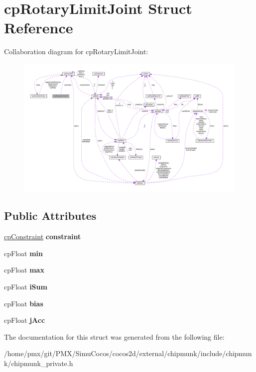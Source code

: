 \hypertarget{structcpRotaryLimitJoint}{}\section{cp\+Rotary\+Limit\+Joint Struct Reference}
\label{structcpRotaryLimitJoint}


Collaboration diagram for cp\+Rotary\+Limit\+Joint\+:
\nopagebreak
\begin{figure}[H]
\begin{center}
\leavevmode
\includegraphics[width=350pt]{structcpRotaryLimitJoint__coll__graph}
\end{center}
\end{figure}
\subsection*{Public Attributes}
\begin{DoxyCompactItemize}
\item 
\mbox{\label{structcpRotaryLimitJoint_a447ab04f7ecace3c2cb7a9ad19e974ff}} 
\hyperlink{structcpConstraint}{cp\+Constraint} {\bfseries constraint}
\item 
\mbox{\label{structcpRotaryLimitJoint_aa189b3e6886001824f2ae140d69c7322}} 
cp\+Float {\bfseries min}
\item 
\mbox{\label{structcpRotaryLimitJoint_a0706d6b4bcefcf85838256418ed3283e}} 
cp\+Float {\bfseries max}
\item 
\mbox{\label{structcpRotaryLimitJoint_a5ec0c0943aa2f6afb90b114b8878bef5}} 
cp\+Float {\bfseries i\+Sum}
\item 
\mbox{\label{structcpRotaryLimitJoint_a33bcd5092edad3f9e2d251c17fc18679}} 
cp\+Float {\bfseries bias}
\item 
\mbox{\label{structcpRotaryLimitJoint_acd814943fe9a4065927ce4071d70adfd}} 
cp\+Float {\bfseries j\+Acc}
\end{DoxyCompactItemize}


The documentation for this struct was generated from the following file\+:\begin{DoxyCompactItemize}
\item 
/home/pmx/git/\+P\+M\+X/\+Simu\+Cocos/cocos2d/external/chipmunk/include/chipmunk/chipmunk\+\_\+private.\+h\end{DoxyCompactItemize}
